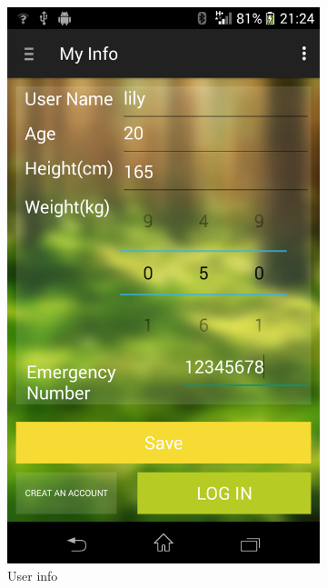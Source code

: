 \begin{figure}
\begin{subfigure}{.24\textwidth}
  \includegraphics[width=.8\linewidth]{img/screenshot/ss5.png}
  \caption{User info}
\end{subfigure}%
\begin{subfigure}{.24\textwidth}
  \centering

\end{subfigure}
\end{figure}
